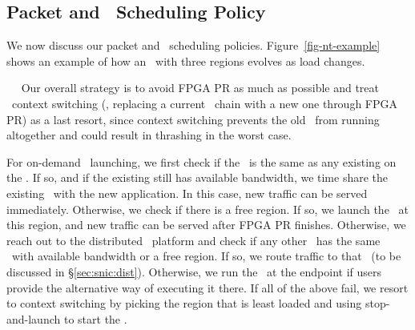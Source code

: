 

\subsection{Packet and \nt\ Scheduling Policy}
\label{sec:snic:policy}

We now discuss our packet and \nt\ scheduling policies.
Figure~\ref{fig-nt-example} shows an example of how an \snic\ with three regions evolves as load changes.

~~
Our overall strategy is to avoid FPGA PR as much as possible and treat \nt\ context switching (\ie, replacing a current \nt\ chain with a new one through FPGA PR) as a last resort, since context switching prevents the old \nt\ from running altogether and could result in thrashing in the worst case. 

For on-demand \nt\ launching, we first check if the \nt\ is the same as any existing \nt{} on the \snic.
If so, and if the existing \nt{} still has available bandwidth, we time share the existing \nt\ with the new application. %
In this case, new traffic can be served immediately.
Otherwise, we check if there is a free region.
If so, we launch the \nt\ at this region, and new traffic can be served after FPGA PR finishes.
Otherwise, we reach out to the distributed \snic\ platform and check if any other \snic\ has the same \nt\ with available bandwidth or a free region. 
If so, we route traffic to that \snic\ (to be discussed in \S\ref{sec:snic:dist}).
Otherwise, we run the \nt\ at the endpoint if users provide the alternative way of executing it there.
If all of the above fail, we resort to context switching by picking the region that is least loaded and using stop-and-launch to start the \nt.

